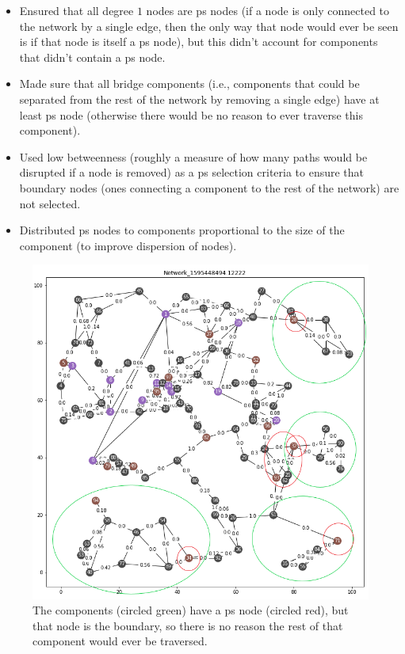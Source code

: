 \documentclass{finalreport}
\begin{document}
\begin{itemize}
	\item Ensured that all \gls{degree} $1$ nodes are \gls{ps} nodes (if a node is only connected to the network by a single edge, then the only way that node would ever be seen is if that node is itself a \gls{ps} node), but this didn't account for components that didn't contain a \gls{ps} node.
	\item Made sure that all \gls{bridge} components (i.e., \glspl{component} that could be separated from the rest of the network by removing a single edge) have at least \gls{ps} node (otherwise there would be no reason to ever traverse this component).
	\item Used low \gls{betweenness} (roughly a measure of how many paths would be disrupted if a node is removed) as a \gls{ps} selection criteria to ensure that \gls{boundary} nodes (ones connecting a \gls{component} to the rest of the network) are not selected.
	\item Distributed \gls{ps} nodes to \glspl{component} proportional to the size of the component (to improve dispersion of nodes).
\end{itemize}

\begin{figure}[!ht]
\centering
\includegraphics[width=.8\linewidth]{week_3/04 - Component Issues.png}
\caption{The \glspl{component} (circled green) have a \gls{ps} node (circled red), but that node is the \gls{boundary}, so there is no reason the rest of that component would ever be traversed.}
\end{figure}
\end{document}
